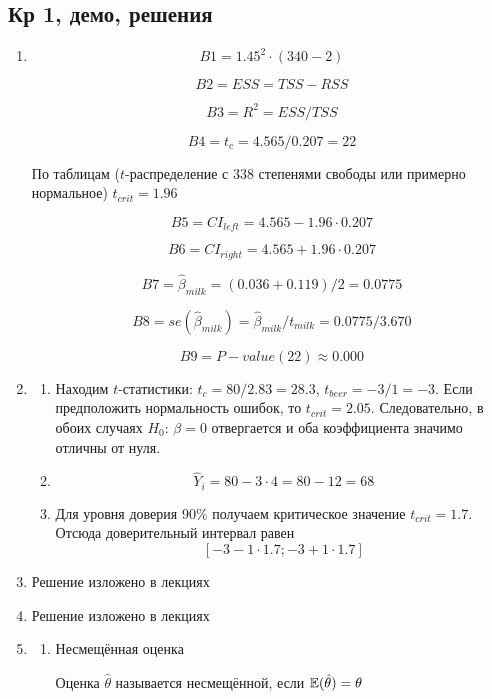 \documentclass[12pt, a4paper]{article}
\begin{document}
\subsection{Кр 1, демо, решения}

\begin{enumerate}

\item
\[
B1 = 1.45^2 \cdot (340-2)
\]

\[
B2 = ESS = TSS - RSS
\]

\[
B3 = R^2 = ESS / TSS
\]

\[
B4 = t_c = 4.565 / 0.207 = 22
\]

По таблицам ($t$-распределение с 338 степенями свободы или примерно нормальное) $t_{crit} = 1.96$

\[
B5 = CI_{left} = 4.565 - 1.96 \cdot 0.207
\]


\[
B6 = CI_{right} = 4.565 + 1.96 \cdot 0.207
\]


\[
B7 = \hat \beta_{milk} = (0.036 + 0.119) /2 = 0.0775
\]

\[
B8 = se(\hat \beta_{milk}) = \hat \beta_{milk} / t_{milk} = 0.0775 / 3.670
\]

\[
B9 = P-value (22) \approx 0.000
\]


\item
\begin{enumerate}
\item
Находим $t$-статистики: $t_c = 80/2.83 = 28.3$, $t_{beer} = -3/1 = -3$. Если предположить нормальность ошибок, то $t_{crit} = 2.05$. Следовательно, в обоих случаях $H_0$: $\beta = 0$ отвергается и оба коэффициента значимо отличны от нуля.


\item
\[
\hat Y_i = 80 - 3 \cdot 4 = 80 - 12 = 68
\]

\item
Для уровня доверия 90\% получаем критическое значение $t_{crit}=1.7$. Отсюда доверительный интервал равен
\[
[-3-1\cdot 1.7;-3 + 1\cdot 1.7]
\]


\end{enumerate}


\item  Решение изложено в лекциях
\item  Решение изложено в лекциях


\item
\begin{enumerate}
\item Несмещённая оценка

Оценка $\hat \theta$ называется несмещённой, если $\mathbb{E}(\hat\theta)=\theta$


\end{enumerate}
\end{enumerate}
\end{document}
